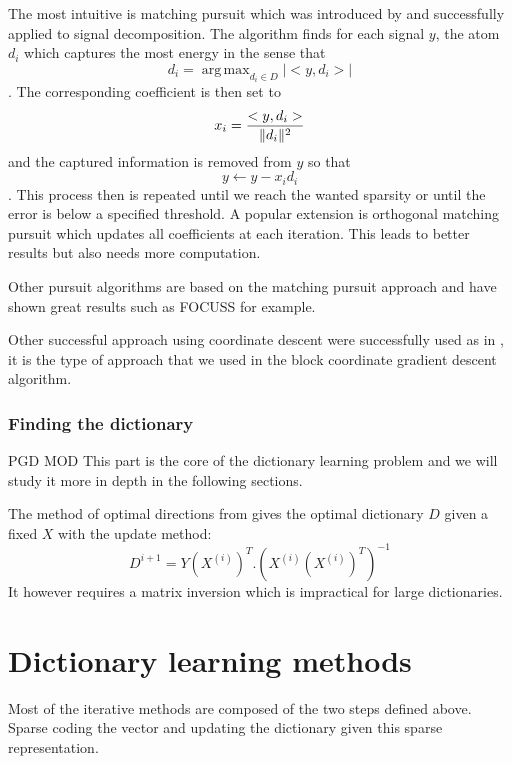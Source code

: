 \documentclass[a4paper,11pt]{article}
\DeclarePairedDelimiter\norm{\lVert}{\rVert} %
\DeclareMathOperator*{\argmax}{arg\,max} %
\begin{document}
The most intuitive is matching pursuit which was introduced by \cite{mallat93} and successfully applied to signal decomposition.
The algorithm finds for each signal $y$, the atom $d_i$ which captures the most energy in the sense that
$$d_i = \argmax_{d_i \in D} |<y, d_i>|$$.
The corresponding coefficient is then set to $$x_i = \frac{<y, d_i>}{\norm{d_i}^2}$$ and the captured information is removed from $y$ so that $$y \leftarrow y - x_i d_i$$.
This process then is repeated until we reach the wanted sparsity or until the error is below a specified threshold.
A popular extension is orthogonal matching pursuit which updates all coefficients at each iteration. This leads to better results but also needs more computation.

Other pursuit algorithms are based on the matching pursuit approach and have shown great results such as FOCUSS for example.

Other successful approach using coordinate descent were successfully used as in \cite{wu08}, it is the type of approach that we used in the block coordinate gradient descent algorithm.

\subsubsection{Finding the dictionary}
PGD MOD
This part is the core of the dictionary learning problem and we will study it more in depth in the following sections.

The method of optimal directions from \cite{engan99} gives the optimal dictionary $D$ given a fixed $X$ with the update method:
$$ D^{i+1} = Y (X^{(i)})^T . (X^{(i)} (X^{(i)})^T)^{-1} $$
It however requires a matrix inversion which is impractical for large dictionaries.


\section{Dictionary learning methods}
Most of the iterative methods are composed of the two steps defined above.
Sparse coding the vector and updating the dictionary given this sparse representation.
\end{document}
